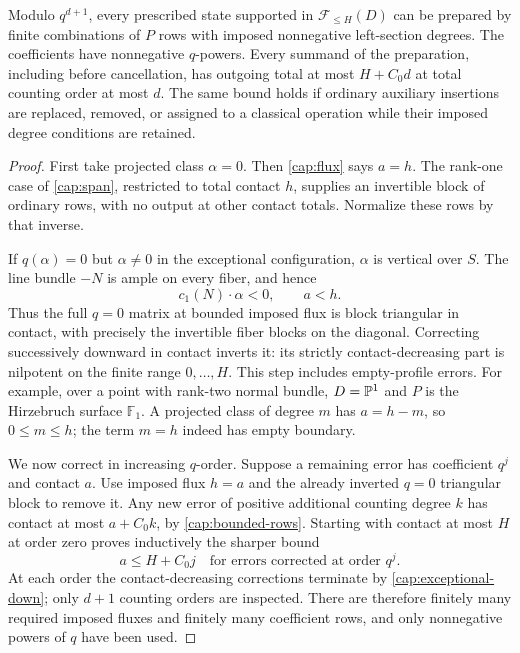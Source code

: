\begin{lemma}\label{cap:P}
Modulo $q^{d+1}$, every prescribed state supported in
$\mathcal F_{\leq H}(D)$ can be prepared by finite combinations of
$P$ rows with imposed nonnegative left-section degrees.  The
coefficients have nonnegative $q$-powers.  Every summand of the
preparation, including before cancellation, has outgoing total at
most $H+C_0d$ at total counting order at most $d$.
The same bound holds if ordinary auxiliary insertions are replaced,
removed, or assigned to a classical operation while their imposed
degree conditions are retained.
\end{lemma}
\begin{proof}
First take projected class $\alpha=0$.  Then
\eqref{cap:flux} says $a=h$.  The rank-one case of
\cref{cap:span}, restricted to total contact $h$, supplies an
invertible block of ordinary rows, with no output at other contact
totals.  Normalize these rows by that inverse.

If $q(\alpha)=0$ but $\alpha\ne0$ in the exceptional configuration,
$\alpha$ is vertical over $S$.  The line bundle $-N$ is ample on
every fiber, and hence
\begin{equation}\label{cap:exceptional-down}
            c_1(N)\cdot\alpha<0,\qquad a<h.
\end{equation}
Thus the full $q=0$ matrix at bounded imposed flux is block triangular
in contact, with precisely the invertible fiber blocks on the
diagonal.  Correcting successively downward in contact inverts it:
its strictly contact-decreasing part is nilpotent on the finite
range $0,\ldots,H$.  This step includes empty-profile errors.
For example, over a point with rank-two normal bundle, $D=\mathbb P^1$
and $P$ is the Hirzebruch surface $\mathbb F_1$.  A projected class
of degree $m$ has $a=h-m$, so $0\leq m\leq h$; the term $m=h$
indeed has empty boundary.

We now correct in increasing $q$-order.  Suppose a remaining error
has coefficient $q^j$ and contact $a$.  Use imposed flux $h=a$ and
the already inverted $q=0$ triangular block to remove it.  Any new
error of positive additional counting degree $k$ has contact at
most $a+C_0k$, by \cref{cap:bounded-rows}.  Starting with contact
at most $H$ at order zero proves inductively the sharper bound
\begin{equation}\label{cap:weighted-bound}
            a\leq H+C_0j
            \quad\text{for errors corrected at order }q^j.
\end{equation}
At each order the contact-decreasing corrections terminate by
\eqref{cap:exceptional-down}; only $d+1$ counting orders are
inspected.  There are therefore finitely many required imposed
fluxes and finitely many coefficient rows, and only nonnegative
powers of $q$ have been used.


\end{proof}
